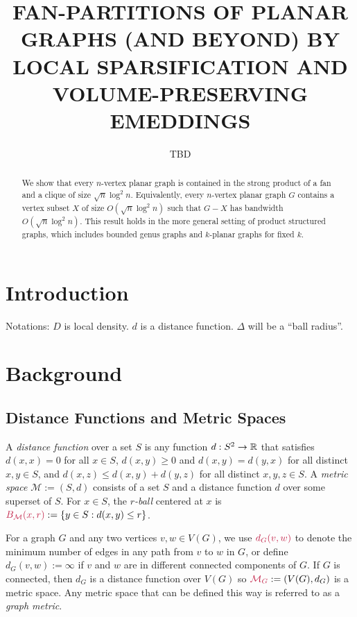 \documentclass{patmorin}
\title{\MakeUppercase{Fan-Partitions of Planar Graphs (and Beyond)
  \newline by Local Sparsification and Volume-Preserving Emeddings}}
\author{TBD}
\date{}
\makeatletter
\newcommand{\defin}[1]{\emph{\textcolor{brightmaroon}{#1}}}
\def\mathcolor#1#{\@mathcolor{#1}}
\def\@mathcolor#1#2#3{%
  \protect\leavevmode
  \begingroup
    \color#1{#2}#3%
  \endgroup
}
\newcommand{\mathdefin}[1]{\mathcolor{brightmaroon}{#1}}
\makeatother
\begin{document}
\maketitle

\begin{abstract}
  We show that every $n$-vertex planar graph is contained in the strong product of a fan and a clique of size $\sqrt{n}\log^2 n$.  Equivalently, every $n$-vertex planar graph $G$ contains a vertex subset $X$ of size $O(\sqrt{n}\log^2 n)$ such that $G-X$ has bandwidth $O(\sqrt{n}\log^2 n)$.  This result holds in the more general setting of product structured graphs, which includes bounded genus graphs and $k$-planar graphs for fixed $k$.
\end{abstract}

\section{Introduction}


Notations: $D$ is local density.  $d$ is a distance function. $\Delta$ will be a ``ball radius''.


\section{Background}

\subsection{Distance Functions and Metric Spaces}

A \defin{distance function} over a set $S$ is any function $d:S^2\to\mathbb{R}$ that satisfies $d(x,x)=0$ for all $x\in S$, $d(x,y)\ge 0$ and $d(x,y)=d(y,x)$ for all distinct $x,y\in S$, and $d(x,z) \le d(x,y)+d(y,z)$ for all distinct $x,y,z\in S$.  A \defin{metric space} $\mathcal{M}:=(S,d)$ consists of a set $S$ and a distance function $d$ over some superset of $S$.  For $x\in S$, the \defin{$r$-ball} centered at $x$ is $\mathdefin{B_{\mathcal{M}}(x,r)}:=\{y\in S:d(x,y)\le r\}$.

For a graph $G$ and any two vertices $v,w\in V(G)$, we use $\mathdefin{d_G(v,w)}$ to denote the minimum number of edges in any path from $v$ to $w$ in $G$, or define $d_G(v,w):=\infty$ if $v$ and $w$ are in different connected components of $G$.  If $G$ is connected, then $d_G$ is a distance function over $V(G)$ so $\mathdefin{\mathcal{M}_G}:=(V(G),d_G)$ is a metric space. Any metric space that can be defined this way is referred to as a \defin{graph metric}.
\end{document}
